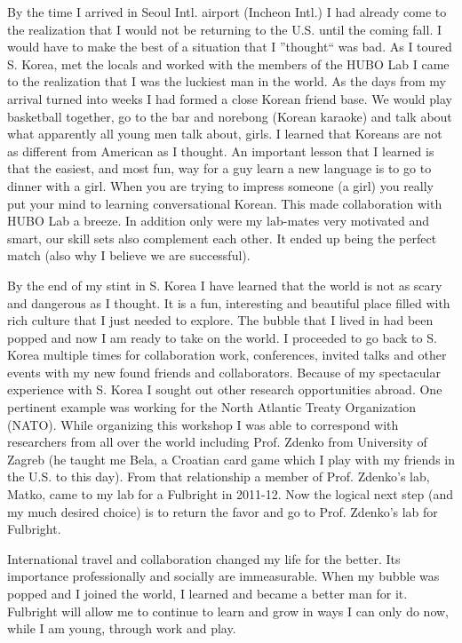 \documentclass[12pt]{article}
\begin{document}
	By the time I arrived in Seoul Intl. airport (Incheon Intl.) I had already come to the realization that I would not be returning to the U.S. until the coming fall.  
I would have to make the best of a situation that I ''thought`` was bad.  
As I toured S. Korea, met the locals and worked with the members of the HUBO Lab I came to the realization that I was the luckiest man in the world. 
 As the days from my arrival turned into weeks I had formed a close Korean friend base.
We would play basketball together, go to the bar and norebong (Korean karaoke) and talk about what apparently all young men talk about, girls.  
I learned that Koreans are not as different from American as I thought.
An important lesson that I learned is that the easiest, and most fun, way for a guy learn a new language is to go to dinner with a girl.
When you are trying to impress someone (a girl) you really put your mind to learning conversational Korean.  
This made collaboration with HUBO Lab a breeze.  
In addition only were my lab-mates very motivated and smart, our skill sets also complement each other.  
It ended up being the perfect match (also why I believe we are successful).  



By the end of my stint in S. Korea I have learned that the world is not as scary and dangerous as I thought.
It is a fun, interesting and beautiful place filled with rich culture that I just needed to explore.
The bubble that I lived in had been popped and now I am ready to take on the world.  
I proceeded to go back to S. Korea multiple times for collaboration work, conferences, invited talks and other events with my new found friends and collaborators.  
Because of my spectacular experience with S. Korea I sought out other research opportunities abroad.  
One pertinent example was working for the North Atlantic Treaty Organization (NATO).
While organizing this workshop I was able to correspond with researchers from all over the world including Prof. Zdenko from University of Zagreb (he taught me Bela, a Croatian card game which I play with my friends in the U.S. to this day).  
From that relationship a member of Prof. Zdenko’s lab, Matko, came to my lab for a Fulbright in 2011-12.  
Now the logical next step (and my much desired choice) is to return the favor and go to Prof. Zdenko's lab for Fulbright.

International travel and collaboration changed my life for the better.
Its importance professionally and socially are immeasurable.
When my bubble was popped and I joined the world, I learned and became a better man for it.
Fulbright will allow me to continue to learn and grow in ways I can only do now, while I am young, through work and play.
\end{document}
